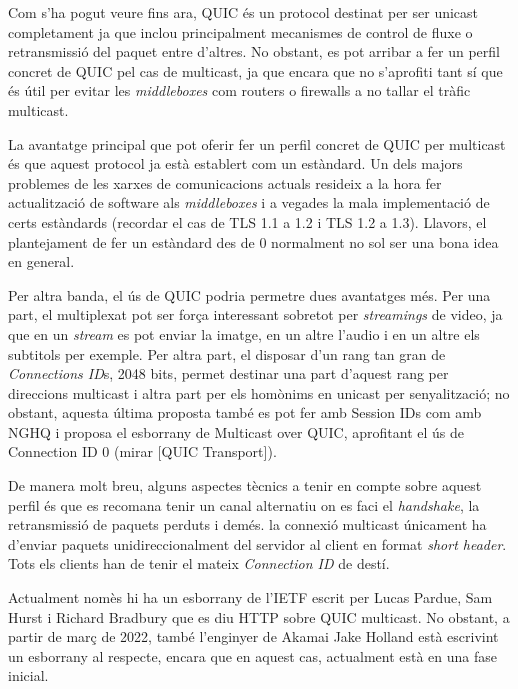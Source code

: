 {
    Com s'ha pogut veure fins ara, QUIC és un protocol destinat per ser unicast completament ja que inclou principalment mecanismes de control de fluxe o 
    retransmissió del paquet entre d'altres. No obstant, es pot arribar a fer un perfil concret de QUIC pel cas de multicast, ja que encara que no s'aprofiti
    tant sí que és útil per evitar les \textit{middleboxes} com routers o firewalls a no tallar el tràfic multicast.

    La avantatge principal que pot oferir fer un perfil concret de QUIC per multicast és que aquest protocol ja està establert com un estàndard. Un dels majors
    problemes de les xarxes de comunicacions actuals resideix a la hora fer actualització de software als \textit{middleboxes} i a vegades la mala implementació
    de certs estàndards (recordar el cas de TLS 1.1 a 1.2 i TLS 1.2 a 1.3). Llavors, el plantejament de fer un estàndard des de 0 normalment no sol ser una bona 
    idea en general.

    Per altra banda, el ús de QUIC podria permetre dues avantatges més. Per una part, el multiplexat pot ser força interessant sobretot per \textit{streamings} 
    de video, ja que en un \textit{stream} es pot enviar la imatge, en un altre l'audio i en un altre els subtitols per exemple. Per altra part, el disposar 
    d'un rang tan gran de \textit{Connections ID}s, 2048 bits, permet destinar una part d'aquest rang per direccions multicast i altra part per els homònims 
    en unicast per senyalització; no obstant, aquesta última proposta també es pot fer amb Session IDs com amb NGHQ i proposa el esborrany de Multicast over QUIC,
    aprofitant el ús de Connection ID 0 (mirar [QUIC Transport]).
    
    De manera molt breu, alguns aspectes tècnics a tenir en compte sobre aquest perfil és que es recomana tenir un canal alternatiu on es faci el \textit{handshake},
    la retransmissió de paquets perduts i demés. la connexió multicast únicament ha d'enviar paquets unidireccionalment del servidor al client en format \textit{short
    header}. Tots els clients han de tenir el mateix \textit{Connection ID} de destí.

    Actualment nomès hi ha un esborrany de l'IETF escrit per Lucas Pardue, Sam Hurst i Richard Bradbury que es diu HTTP sobre QUIC multicast. No obstant, a partir de 
    març de 2022, també l'enginyer de Akamai Jake Holland està escrivint un esborrany al respecte, encara que en aquest cas, actualment està en una fase inicial.
}


